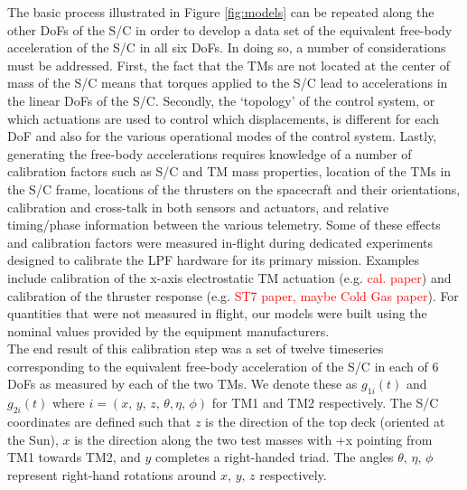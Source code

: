 \documentclass[twocolumn, trackchanges]{aastex61}
\newcommand{\red}[1]{\textcolor{red}{#1}}
\begin{document}
The basic process illustrated in Figure \ref{fig:models} can be repeated along the other DoFs of the S/C in order to develop a data set of the equivalent free-body acceleration of the S/C in all six DoFs. In doing so, a number of considerations must be addressed. First, the fact that the TMs are not located at the center of mass of the S/C means that torques applied to the S/C lead to accelerations in the linear DoFs of the S/C.  Secondly, the `topology' of the control system, or which actuations are used to control which displacements, is different for each DoF and also for the various operational modes of the control system. Lastly, generating the free-body accelerations requires knowledge of a number of calibration factors such as S/C and TM mass properties, location of the TMs in the S/C frame, locations of the thrusters on the spacecraft and their orientations, calibration and cross-talk in both sensors and actuators, and relative timing/phase information between the various telemetry.  Some of these effects and calibration factors were measured in-flight during dedicated experiments designed to calibrate the LPF hardware for its primary mission. Examples include calibration of the x-axis electrostatic TM actuation (e.g. \red{cal. paper}) and calibration of the thruster response (e.g. \red{ST7 paper, maybe Cold Gas paper}). For quantities that were not measured in flight, our models were built using the nominal values provided by the equipment manufacturers. 
\\
The end result of this calibration step was a set of twelve timeseries corresponding to the equivalent free-body acceleration of the S/C in each of 6 DoFs as measured by each of the two TMs. We denote these as $g_{1i}(t)$ and $g_{2i}(t)$ where $i=\left(x,\,y,\,z,\,\theta,\eta,\,\phi\right)$ for TM1 and TM2 respectively. The S/C coordinates are defined such that $z$ is the direction of the top deck (oriented at the Sun), $x$ is the direction along the two test masses with +x pointing from TM1 towards TM2, and $y$ completes a right-handed triad. The angles $\theta,\,\eta,\,\phi$ represent right-hand rotations around $x,\,y,\,z$ respectively.
\end{document}
